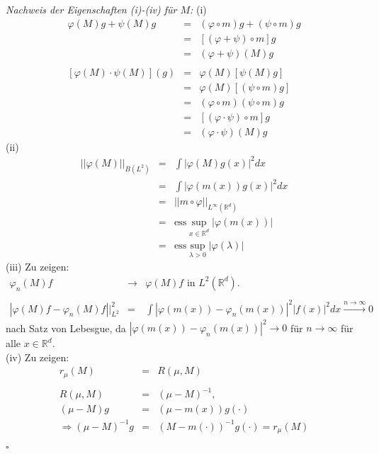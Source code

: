 \documentclass[11pt,a4paper,titlepage, ngerman]{scrartcl}
\numberwithin{equation}{section}
\newcommand{\R}{\mathbb{R}} %
\newcommand{\m}{\cdot}
\newcommand{\qed}{\begin{flushright}
		$\square$
	\end{flushright}}
\begin{document}
	\emph{Nachweis der Eigenschaften (i)-(iv) für $M$:} (i)
	\begin{eqnarray}
		\varphi(M)g +\psi(M)g &=& (\varphi\circ m)g+(\psi\circ m)g\nonumber\\
		&=& \left[(\varphi+\psi)\circ m \right]g \nonumber\\
		&=& (\varphi+\psi)(M)g\nonumber\\ \nonumber\\
		\left[\varphi(M)\m \psi(M) \right](g) &=& \varphi(M)\left[\psi(M)g \right]\nonumber\\
		&=& \varphi(M)\left[(\psi\circ m)g \right]\nonumber\\
		&=& (\varphi\circ m)(\psi\circ m)g\nonumber\\
		&=& \left[(\varphi\m \psi)\circ m\right] g\nonumber\\
		&=& (\varphi\m \psi)(M)g\nonumber
	\end{eqnarray}
	(ii)
	\begin{eqnarray}
		||\varphi(M)||_{B(L^2)} &=& \int |\varphi(M)g(x)|^2 dx\nonumber\\
		&=& \int|\varphi(m(x))g(x)|^2dx\nonumber\\
		&=& ||m\circ\varphi||_{L^\infty(\R^d)}\nonumber\\
		&=& \text{ess}\sup_{x\in \R^d}|\varphi(m(x))|\nonumber\\
		&=& \text{ess}\sup_{\lambda>0}|\varphi(\lambda)|\nonumber
	\end{eqnarray}
	(iii) Zu zeigen:
	\begin{eqnarray}
		\varphi_n(M)f &\rightarrow& \varphi(M)f\text{ in } L^2(\R^d).\nonumber\\
		\nonumber\\
		|\varphi(M)f-\varphi_n(M)f||_{L^2}^2 &=&\int |\varphi(m(x)) - \varphi_n(m(x))|^2 |f(x)|^2 dx\overset{n\rightarrow \infty}{\longrightarrow} 0\nonumber
	\end{eqnarray}
	nach Satz von Lebesgue, da $|\varphi(m(x)) - \varphi_n(m(x))|^2\rightarrow 0$ für $n\rightarrow\infty$ für alle $x\in \R^d$.\\
	(iv) Zu zeigen:
	\begin{eqnarray}
		r_\mu(M) &=& R(\mu, M)\nonumber\\
		\nonumber\\
		R(\mu,M)&=& (\mu-M)^{-1},\nonumber\\
		(\mu-M)g&=& (\mu-m(x))g(\m)\nonumber\\
		\Rightarrow (\mu-M)^{-1}g &=& (M-m(\m))^{-1}g(\m) = r_\mu(M)\nonumber
	\end{eqnarray}
	\qed
	
\end{document}
